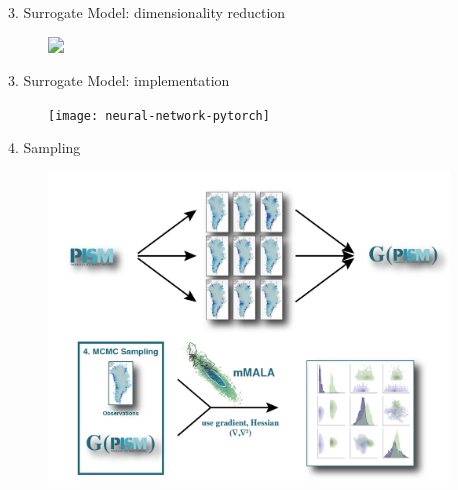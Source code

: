 \documentclass[hide notes,intlimits]{beamer}
\begin{document}
\begin{frame}{3. Surrogate Model: dimensionality reduction}
  \vspace{-0.5em}
  \begin{minipage}[t][8.2cm][t]{\textwidth}
    \begin{figure}
      \includegraphics<1>[width=\textwidth]{surrogate_model_pca}
    \end{figure}
  \end{minipage}
\end{frame}


\begin{frame}{3. Surrogate Model: implementation}
  \begin{figure}
    \texttt{[image: neural-network-pytorch]}
  \end{figure}
\end{frame}

\begin{frame}{4. Sampling}
  \vspace{-1.5em}
    \begin{minipage}[t][8.2cm][t]{\textwidth}
    \begin{figure}
      \includegraphics[height=8.2cm]{surrogate_model_4_mala}
    \end{figure}
    \end{minipage}
\end{frame}
\end{document}
